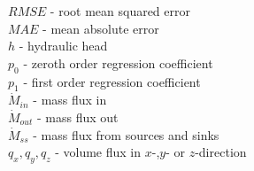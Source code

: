 \begin{tabbing}
    \> $RMSE$ \> - \> root mean squared error\\

    \> $MAE$ \> - \> mean absolute error\\

    \> $h$ \> - \> hydraulic head\\

    \> $p_0$ \> - \> zeroth order regression coefficient\\

    \> $p_1$ \> - \> first order regression coefficient\\

    \> $\dot{M}_{in}$ \> - \> mass flux in\\

    \> $\dot{M}_{out}$ \> - \> mass flux out\\

    \> $\dot{M}_{ss}$ \> - \> mass flux from sources and sinks\\

    \> $q_{x},q_{y},q_{z}$ \> - \> volume flux in $x$-,$y$- or $z$-direction\\










\end{tabbing}
